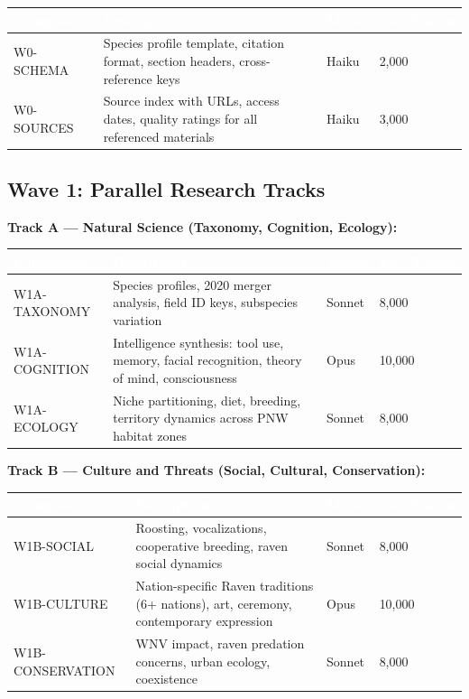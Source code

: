 \documentclass[11pt,letterpaper]{article}
\newcommand{\tableheader}[1]{\textbf{\sffamily\textcolor{white}{#1}}}
\begin{document}
\begin{center}
\begin{tabularx}{\textwidth}{L{2.5cm}XC{1.5cm}C{2cm}}
\toprule
{}
\tableheader{Component} & \tableheader{Description} & \tableheader{Model} & \tableheader{Est.\ Tokens} \\
\midrule
W0-SCHEMA & Species profile template, citation format, section headers, cross-reference keys & Haiku & 2,000 \\
W0-SOURCES & Source index with URLs, access dates, quality ratings for all referenced materials & Haiku & 3,000 \\
\bottomrule
\end{tabularx}
\end{center}

\subsection{Wave 1: Parallel Research Tracks}

\textbf{Track A --- Natural Science (Taxonomy, Cognition, Ecology):}

\begin{center}
\begin{tabularx}{\textwidth}{L{2.5cm}XC{1.5cm}C{2cm}}
\toprule
{}
\tableheader{Component} & \tableheader{Description} & \tableheader{Model} & \tableheader{Est.\ Tokens} \\
\midrule
W1A-TAXONOMY & Species profiles, 2020 merger analysis, field ID keys, subspecies variation & Sonnet & 8,000 \\
W1A-COGNITION & Intelligence synthesis: tool use, memory, facial recognition, theory of mind, consciousness & Opus & 10,000 \\
W1A-ECOLOGY & Niche partitioning, diet, breeding, territory dynamics across PNW habitat zones & Sonnet & 8,000 \\
\bottomrule
\end{tabularx}
\end{center}

\textbf{Track B --- Culture and Threats (Social, Cultural, Conservation):}

\begin{center}
\begin{tabularx}{\textwidth}{L{2.5cm}XC{1.5cm}C{2cm}}
\toprule
{}
\tableheader{Component} & \tableheader{Description} & \tableheader{Model} & \tableheader{Est.\ Tokens} \\
\midrule
W1B-SOCIAL & Roosting, vocalizations, cooperative breeding, raven social dynamics & Sonnet & 8,000 \\
W1B-CULTURE & Nation-specific Raven traditions (6+ nations), art, ceremony, contemporary expression & Opus & 10,000 \\
W1B-CONSERVATION & WNV impact, raven predation concerns, urban ecology, coexistence & Sonnet & 8,000 \\
\bottomrule
\end{tabularx}
\end{center}
\end{document}
